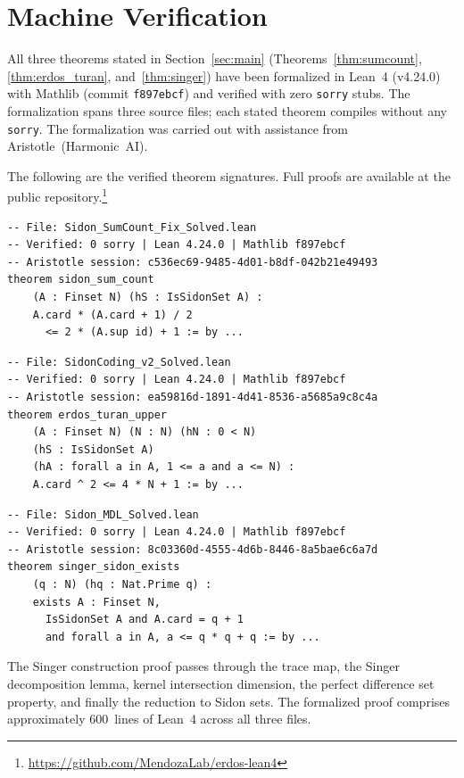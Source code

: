 \documentclass[11pt]{amsart}
\theoremstyle{plain}
\theoremstyle{definition}
\theoremstyle{remark}
\begin{document}
\section{Machine Verification}\label{sec:lean}

All three theorems stated in Section~\ref{sec:main}
(Theorems~\ref{thm:sumcount}, \ref{thm:erdos_turan},
and~\ref{thm:singer}) have been formalized in Lean~4 (v4.24.0) with
Mathlib (commit \texttt{f897ebcf}) and verified with zero
\texttt{sorry} stubs.
The formalization spans three source files; each stated theorem
compiles without any \texttt{sorry}.
The formalization was carried out with assistance from
Aristotle~(Harmonic~AI).

The following are the verified theorem signatures.
Full proofs are available at the public repository.\footnote{%
  \url{https://github.com/MendozaLab/erdos-lean4}}

\begin{lstlisting}
-- File: Sidon_SumCount_Fix_Solved.lean
-- Verified: 0 sorry | Lean 4.24.0 | Mathlib f897ebcf
-- Aristotle session: c536ec69-9485-4d01-b8df-042b21e49493
theorem sidon_sum_count
    (A : Finset N) (hS : IsSidonSet A) :
    A.card * (A.card + 1) / 2
      <= 2 * (A.sup id) + 1 := by ...
\end{lstlisting}

\begin{lstlisting}
-- File: SidonCoding_v2_Solved.lean
-- Verified: 0 sorry | Lean 4.24.0 | Mathlib f897ebcf
-- Aristotle session: ea59816d-1891-4d41-8536-a5685a9c8c4a
theorem erdos_turan_upper
    (A : Finset N) (N : N) (hN : 0 < N)
    (hS : IsSidonSet A)
    (hA : forall a in A, 1 <= a and a <= N) :
    A.card ^ 2 <= 4 * N + 1 := by ...
\end{lstlisting}

\begin{lstlisting}
-- File: Sidon_MDL_Solved.lean
-- Verified: 0 sorry | Lean 4.24.0 | Mathlib f897ebcf
-- Aristotle session: 8c03360d-4555-4d6b-8446-8a5bae6c6a7d
theorem singer_sidon_exists
    (q : N) (hq : Nat.Prime q) :
    exists A : Finset N,
      IsSidonSet A and A.card = q + 1
      and forall a in A, a <= q * q + q := by ...
\end{lstlisting}

The Singer construction proof passes through the trace map, the Singer
decomposition lemma, kernel intersection dimension, the perfect
difference set property, and finally the reduction to Sidon sets.
The formalized proof comprises approximately 600~lines of Lean~4
across all three files.
\end{document}
